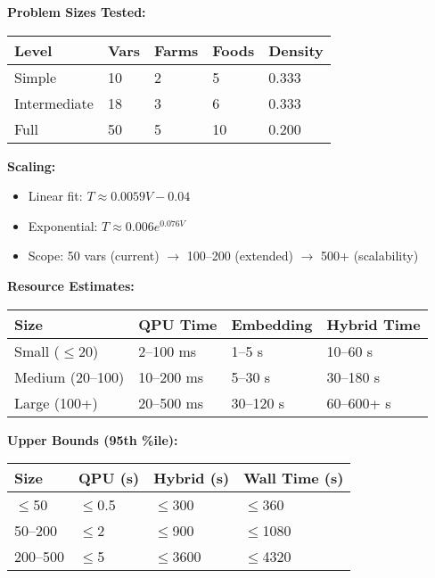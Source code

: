 \medskip
\textbf{Problem Sizes Tested:}

\begin{center}
\begin{tabular}{@{}lllll@{}}
\toprule
Level & Vars & Farms & Foods & Density \\
\midrule
Simple        & 10  & 2 & 5  & 0.333 \\
Intermediate  & 18  & 3 & 6  & 0.333 \\
Full          & 50  & 5 & 10 & 0.200 \\
\bottomrule
\end{tabular}
\end{center}

\medskip
\textbf{Scaling:}
\begin{itemize}
    \item Linear fit: $T \approx 0.0059V - 0.04$
    \item Exponential: $T \approx 0.006e^{0.076V}$
    \item Scope: 50 vars (current) $\to$ 100--200 (extended) $\to$ 500+ (scalability)
\end{itemize}

\medskip
\textbf{Resource Estimates:}

\begin{center}
\begin{tabular}{@{}llll@{}}
\toprule
Size & QPU Time & Embedding & Hybrid Time \\
\midrule
Small ($\leq$20)  & 2--100 ms  & 1--5 s   & 10--60 s \\
Medium (20--100)  & 10--200 ms & 5--30 s  & 30--180 s \\
Large (100+)      & 20--500 ms & 30--120 s & 60--600+ s \\
\bottomrule
\end{tabular}
\end{center}

\medskip
\textbf{Upper Bounds (95th \%ile):}

\begin{center}
\begin{tabular}{@{}llll@{}}
\toprule
Size & QPU (s) & Hybrid (s) & Wall Time (s) \\
\midrule
$\leq$50   & $\leq$0.5 & $\leq$300  & $\leq$360 \\
50--200    & $\leq$2   & $\leq$900  & $\leq$1080 \\
200--500   & $\leq$5   & $\leq$3600 & $\leq$4320 \\
\bottomrule
\end{tabular}
\end{center}

